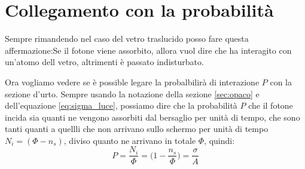 \documentclass[11pt,a4paper]{report}
\begin{document}
	\section{Collegamento con la probabilità}
		Sempre rimandendo nel caso del vetro traslucido posso fare questa affermazione:Se il fotone viene assorbito, allora vuol dire che ha interagito con un'atomo dell vetro, altrimenti è passato indisturbato.\newline

		Ora vogliamo vedere se è possible legare la probalbilirà di interazione $P$ con la sezione d'urto.\newline
		Sempre usando la notazione della sezione \ref{sec:opaco} e dell'equazione \ref{eq:sigma_luce}, possiamo dire che la probabilità $P$ che il fotone incida sia quanti ne vengono assorbiti dal bersaglio per unità di tempo, che sono tanti quanti a quellli che non arrivano sullo schermo per unità di tempo $N_i=(\Phi-n_s)$, diviso quanto ne arrivano in totale $\Phi$, quindi:
		\begin{equation}
			P=\frac {N_i} \Phi=\Big(1-\frac {n_s}\Phi\Big)=\frac\sigma A
			\label{eq:prob1}
		\end{equation}
\end{document}
